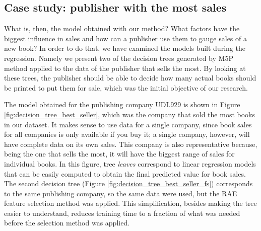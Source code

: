 \documentclass[a4paper,10pt,twocolumn,preprint,3p]{elsarticle}
\begin{document}

\subsection{Case study: publisher with the most sales}
\label{subsec:decision_trees}

What is, then, the model obtained with our method? What factors have
the biggest influence in sales and how can a publisher use them to gauge
sales of a new book? In order to do that, we have examined the models
built during the regression. Namely we present two of the decision
trees generated by M5P method applied to the data of the publisher
that sells the most. By looking at these trees, the publisher should
be able to decide how many actual books should be printed to put them
for sale, which was the initial objective of our research.

The model obtained for the publishing company UDL929 is shown in
Figure \ref{fig:decision_tree_best_seller}, which was the company that
sold the most books in our dataset. It makes sense to use data for a
single company, since book sales for all companies is only available
if you buy it; a single company, however, will have complete data on
its own sales. This company is also representative because, being the
one that sells the most, it will have the biggest range of sales for
individual books. In this figure, tree {\em leaves} correspond to
linear regression models that can be easily computed to obtain the
final predicted value for book sales.
The second decision tree (Figure
\ref{fig:decision_tree_best_seller_fs}) corresponds to the same
publishing company, so the same data were used, but the RAE %
feature
selection method was applied. This simplification, besides making the
tree easier to understand, reduces training time to a fraction of what
was needed before the selection method was applied. 
\end{document}
